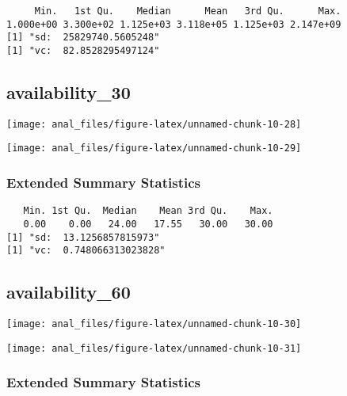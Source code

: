 \begin{verbatim}     Min.   1st Qu.    Median      Mean   3rd Qu.      Max. 
1.000e+00 3.300e+02 1.125e+03 3.118e+05 1.125e+03 2.147e+09 
[1] "sd:  25829740.5605248"
[1] "vc:  82.8528295497124"
\end{verbatim}

\pagebreak

\hypertarget{availability_30}{%
\subsection{availability\_30}\label{availability_30}}

\begin{center}\texttt{[image: anal\_files/figure-latex/unnamed-chunk-10-28]} \end{center}

\begin{center}\texttt{[image: anal\_files/figure-latex/unnamed-chunk-10-29]} \end{center}

\hypertarget{extended-summary-statistics-7}{%
\subsubsection{Extended Summary
Statistics}\label{extended-summary-statistics-7}}

\begin{verbatim}   Min. 1st Qu.  Median    Mean 3rd Qu.    Max. 
   0.00    0.00   24.00   17.55   30.00   30.00 
[1] "sd:  13.1256857815973"
[1] "vc:  0.748066313023828"
\end{verbatim}

\pagebreak

\hypertarget{availability_60}{%
\subsection{availability\_60}\label{availability_60}}

\begin{center}\texttt{[image: anal\_files/figure-latex/unnamed-chunk-10-30]} \end{center}

\begin{center}\texttt{[image: anal\_files/figure-latex/unnamed-chunk-10-31]} \end{center}

\hypertarget{extended-summary-statistics-8}{%
\subsubsection{Extended Summary
Statistics}\label{extended-summary-statistics-8}}

